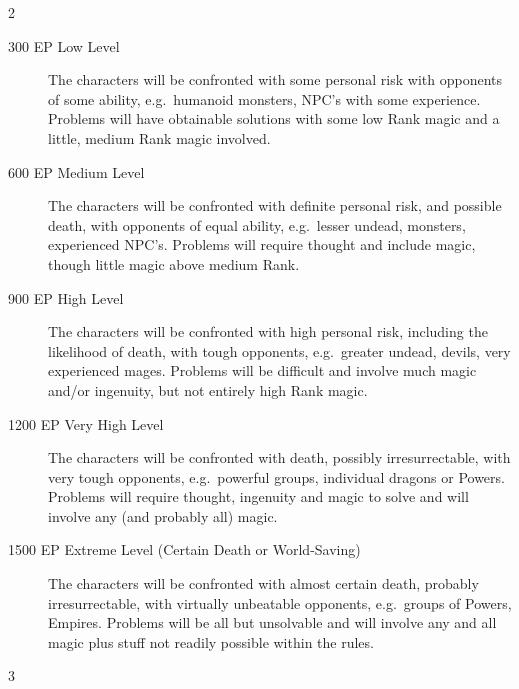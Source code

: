 \documentclass{article}
\begin{document}
\begin{multicols}{2}
\begin{description}
\item[300 EP Low Level] The characters will be confronted with some
personal risk with opponents of some ability, e.g.\ humanoid monsters,
NPC's with some experience.  Problems will have obtainable solutions
with some low Rank magic and a little, medium Rank magic involved.

\item[600 EP Medium Level] The characters will be confronted with
definite personal risk, and possible death, with opponents of equal
ability, e.g.\ lesser undead, monsters, experienced NPC's.  Problems
will require thought and include magic, though little magic above
medium Rank.

\item[900 EP High Level] The characters will be confronted with high
personal risk, including the likelihood of death, with tough
opponents, e.g.\  greater undead, devils, very experienced mages.
Problems will be difficult and involve much magic and/or ingenuity,
but not entirely high Rank magic.

\item[1200 EP Very High Level] The characters will be confronted with
death, possibly irresurrectable, with very tough opponents, e.g.\
powerful groups, individual dragons or Powers.  Problems will require
thought, ingenuity and magic to solve and will involve any (and
probably all) magic.

\item[1500 EP Extreme Level (Certain Death or World-Saving)] The
characters will be confronted with almost certain death, probably
irresurrectable, with virtually unbeatable opponents, e.g.\ groups of
Powers, Empires.  Problems will be all but unsolvable and will involve
any and all magic plus stuff not readily possible within the rules.
\end{description}

\end{multicols} 

\pagebreak



\begin{multicols}{3}

\setcounter{secnumdepth}{3}





\end{multicols}
\end{document}
